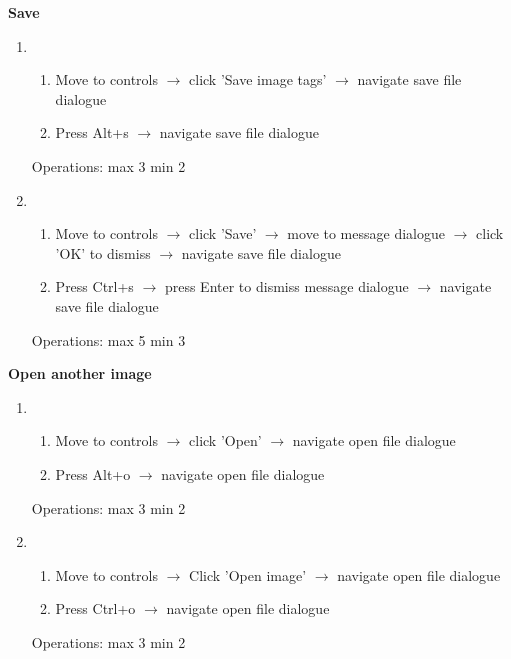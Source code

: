 \documentclass[a4paper,11pt,oneside]{article}
\begin{document}
{\bf Save}
\begin{enumerate}
    \item
    \begin{enumerate}
        \item Move to controls $\rightarrow$ click 'Save image tags' $\rightarrow$ navigate save file dialogue
        \item Press Alt+s $\rightarrow$ navigate save file dialogue
    \end{enumerate}
    Operations: max 3 min 2
    \item
    \begin{enumerate}
        \item Move to controls $\rightarrow$ click 'Save' $\rightarrow$ move to message dialogue $\rightarrow$ click 'OK' to dismiss $\rightarrow$ navigate save file dialogue
        \item Press Ctrl+s $\rightarrow$ press Enter to dismiss message dialogue $\rightarrow$ navigate save file dialogue
    \end{enumerate}
    Operations: max 5 min 3
\end{enumerate}

{\bf Open another image}
\begin{enumerate}
    \item
    \begin{enumerate}
        \item Move to controls $\rightarrow$ click 'Open' $\rightarrow$ navigate open file dialogue
        \item Press Alt+o $\rightarrow$ navigate open file dialogue
    \end{enumerate}
    Operations: max 3 min 2
    \item
    \begin{enumerate}
        \item Move to controls $\rightarrow$ Click 'Open image' $\rightarrow$ navigate open file dialogue
        \item Press Ctrl+o $\rightarrow$ navigate open file dialogue
    \end{enumerate}
    Operations: max 3 min 2
\end{enumerate}
\end{document}
